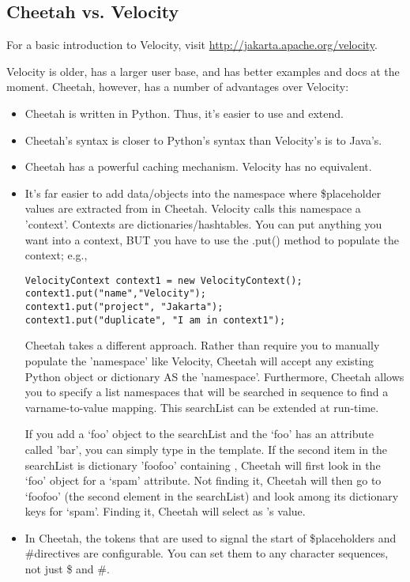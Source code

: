 
\subsection{Cheetah vs. Velocity}
\label{comparisons.velocity}

For a basic introduction to Velocity, visit
\url{http://jakarta.apache.org/velocity}.


Velocity is older, has a larger user base, and has better examples and
docs at the moment. Cheetah, however, has a number of advantages over
Velocity:
\begin{itemize}
\item Cheetah is written in Python. Thus, it's easier to use and extend.
\item Cheetah's syntax is closer to Python's syntax than Velocity's is to
Java's.
\item Cheetah has a powerful caching mechanism.  Velocity has no equivalent.
\item It's far easier to add data/objects into the namespace where \$placeholder
     values are extracted from in Cheetah.  Velocity calls this namespace a 'context'.
     Contexts are dictionaries/hashtables. You can put anything you want into a
     context, BUT you have to use the .put() method to populate the context; 
     e.g.,

\begin{verbatim}
VelocityContext context1 = new VelocityContext();
context1.put("name","Velocity");
context1.put("project", "Jakarta");
context1.put("duplicate", "I am in context1");
\end{verbatim}
     
     Cheetah takes a different approach. Rather than require you to manually
     populate the 'namespace' like Velocity, Cheetah will accept any existing
     Python object or dictionary AS the 'namespace'.  Furthermore, Cheetah
     allows you to specify a list namespaces that will be searched in sequence
     to find a varname-to-value mapping.  This searchList can be extended at
     run-time.
     
    If you add a `foo' object to the searchList and the `foo' has an attribute
    called 'bar', you can simply type  in the template.  If the
    second item in the searchList is dictionary 'foofoo' containing
    , Cheetah will first look in the `foo'
    object for a `spam' attribute.  Not finding it, Cheetah will then go to
    `foofoo' (the second element in the searchList) and look among its
    dictionary keys for `spam'.  Finding it, Cheetah will select
     as 's value.

\item In Cheetah, the tokens that are used to signal the start of
     \$placeholders and \#directives are configurable. You can set them to any
     character sequences, not just \$ and \#.
\end{itemize}


